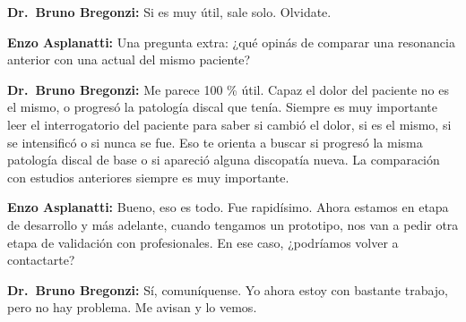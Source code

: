 \noindent\textbf{Dr.~Bruno Bregonzi:} Si es muy útil, sale solo. Olvidate.

\noindent\textbf{Enzo Asplanatti:} Una pregunta extra: ¿qué opinás de comparar una resonancia anterior con una actual del mismo paciente?

\noindent\textbf{Dr.~Bruno Bregonzi:} Me parece 100 \% útil. Capaz el dolor del paciente no es el mismo, o progresó la patología discal que tenía. Siempre es muy importante leer el interrogatorio del paciente para saber si cambió el dolor, si es el mismo, si se intensificó o si nunca se fue. Eso te orienta a buscar si progresó la misma patología discal de base o si apareció alguna discopatía nueva. La comparación con estudios anteriores siempre es muy importante.

\noindent\textbf{Enzo Asplanatti:} Bueno, eso es todo. Fue rapidísimo. Ahora estamos en etapa de desarrollo y más adelante, cuando tengamos un prototipo, nos van a pedir otra etapa de validación con profesionales. En ese caso, ¿podríamos volver a contactarte?

\noindent\textbf{Dr.~Bruno Bregonzi:} Sí, comuníquense. Yo ahora estoy con bastante trabajo, pero no hay problema. Me avisan y lo vemos.
